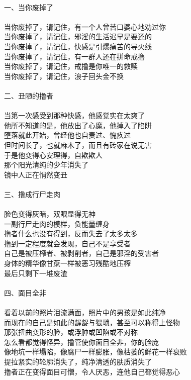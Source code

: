 \begin{poem}
    \begin{adjustwidth}{-4em}{-4em}
        \begin{multicols}{2}
            \centering~\\
            一、当你废掉了 \\~\\
            当你废掉了，请记住，有一个人曾苦口婆心地劝过你 \\ 当你废掉了，请记住，邪淫的生活迟早是要还的 \\ 当你废掉了，请记住，快感是引爆痛苦的导火线 \\ 当你废掉了，请记住，有一群人还在拼命戒撸 \\ 当你废掉了，请记住，戒撸是你唯一的救赎 \\ 当你废掉了，请记住，浪子回头金不换 \\~\\
            二、丑陋的撸者 \\~\\
            当第一次感受到那种快感，他感觉实在太爽了 \\ 他所不知道的是，他放出了心魔，他掉入了陷阱 \\ 堕落就此开始，曾经他也自责过、愧疚过 \\ 但时间长了，也就麻木了，而且有砖家在说无害 \\ 于是他变得心安理得，自欺欺人 \\ 那个阳光清纯的少年消失了 \\ 镜中人正在悄然变丑 \\~\\
            三、撸成行尸走肉 \\~\\
            脸色变得灰暗，双眼显得无神 \\ 一副行尸走肉的模样，负能量缠身 \\ 撸者什么也没有得到，反而失去了太多太多 \\ 撸到一定程度就会发现，自己不是享受者 \\ 自己是被压榨者、被剥削者，自己是邪淫的受害者 \\ 身体的精华像甘蔗一样被恶习残酷地压榨 \\ 最后只剩下一堆废渣 \\~\\
            四、面目全非 \\~\\
            看着以前的照片泪流满面，照片中的男孩是如此纯净 \\ 而现在的自己是如此的龌龊与猥琐，甚至可以称得上怪物 \\ 那张扭曲变形的脸，或浮肿或凹陷或不对称 \\ 怎么看都觉得怪异，撸管使你面目全非，你的脸庞 \\ 像地坑一样塌陷，像腐尸一样膨胀，像枯萎的鲜花一样衰败 \\ 提拉紧实的轮廓消失了，纯净清透的肤质消失了 \\ 撸者正在变得面目可憎，令人厌恶，连他自己都觉得恶心 \\~\\

\end{multicols}
\end{adjustwidth}
\end{poem}
